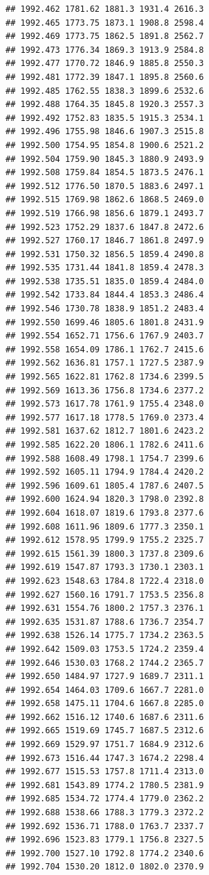 \documentclass[
]{book}
\begin{document}
\begin{verbatim}
## 1992.462 1781.62 1881.3 1931.4 2616.3
## 1992.465 1773.75 1873.1 1908.8 2598.4
## 1992.469 1773.75 1862.5 1891.8 2562.7
## 1992.473 1776.34 1869.3 1913.9 2584.8
## 1992.477 1770.72 1846.9 1885.8 2550.3
## 1992.481 1772.39 1847.1 1895.8 2560.6
## 1992.485 1762.55 1838.3 1899.6 2532.6
## 1992.488 1764.35 1845.8 1920.3 2557.3
## 1992.492 1752.83 1835.5 1915.3 2534.1
## 1992.496 1755.98 1846.6 1907.3 2515.8
## 1992.500 1754.95 1854.8 1900.6 2521.2
## 1992.504 1759.90 1845.3 1880.9 2493.9
## 1992.508 1759.84 1854.5 1873.5 2476.1
## 1992.512 1776.50 1870.5 1883.6 2497.1
## 1992.515 1769.98 1862.6 1868.5 2469.0
## 1992.519 1766.98 1856.6 1879.1 2493.7
## 1992.523 1752.29 1837.6 1847.8 2472.6
## 1992.527 1760.17 1846.7 1861.8 2497.9
## 1992.531 1750.32 1856.5 1859.4 2490.8
## 1992.535 1731.44 1841.8 1859.4 2478.3
## 1992.538 1735.51 1835.0 1859.4 2484.0
## 1992.542 1733.84 1844.4 1853.3 2486.4
## 1992.546 1730.78 1838.9 1851.2 2483.4
## 1992.550 1699.46 1805.6 1801.8 2431.9
## 1992.554 1652.71 1756.6 1767.9 2403.7
## 1992.558 1654.09 1786.1 1762.7 2415.6
## 1992.562 1636.81 1757.1 1727.5 2387.9
## 1992.565 1622.81 1762.8 1734.6 2399.5
## 1992.569 1613.36 1756.8 1734.6 2377.2
## 1992.573 1617.78 1761.9 1755.4 2348.0
## 1992.577 1617.18 1778.5 1769.0 2373.4
## 1992.581 1637.62 1812.7 1801.6 2423.2
## 1992.585 1622.20 1806.1 1782.6 2411.6
## 1992.588 1608.49 1798.1 1754.7 2399.6
## 1992.592 1605.11 1794.9 1784.4 2420.2
## 1992.596 1609.61 1805.4 1787.6 2407.5
## 1992.600 1624.94 1820.3 1798.0 2392.8
## 1992.604 1618.07 1819.6 1793.8 2377.6
## 1992.608 1611.96 1809.6 1777.3 2350.1
## 1992.612 1578.95 1799.9 1755.2 2325.7
## 1992.615 1561.39 1800.3 1737.8 2309.6
## 1992.619 1547.87 1793.3 1730.1 2303.1
## 1992.623 1548.63 1784.8 1722.4 2318.0
## 1992.627 1560.16 1791.7 1753.5 2356.8
## 1992.631 1554.76 1800.2 1757.3 2376.1
## 1992.635 1531.87 1788.6 1736.7 2354.7
## 1992.638 1526.14 1775.7 1734.2 2363.5
## 1992.642 1509.03 1753.5 1724.2 2359.4
## 1992.646 1530.03 1768.2 1744.2 2365.7
## 1992.650 1484.97 1727.9 1689.7 2311.1
## 1992.654 1464.03 1709.6 1667.7 2281.0
## 1992.658 1475.11 1704.6 1667.8 2285.0
## 1992.662 1516.12 1740.6 1687.6 2311.6
## 1992.665 1519.69 1745.7 1687.5 2312.6
## 1992.669 1529.97 1751.7 1684.9 2312.6
## 1992.673 1516.44 1747.3 1674.2 2298.4
## 1992.677 1515.53 1757.8 1711.4 2313.0
## 1992.681 1543.89 1774.2 1780.5 2381.9
## 1992.685 1534.72 1774.4 1779.0 2362.2
## 1992.688 1538.66 1788.3 1779.3 2372.2
## 1992.692 1536.71 1788.0 1763.7 2337.7
## 1992.696 1523.83 1779.1 1756.8 2327.5
## 1992.700 1527.10 1792.8 1774.2 2340.6
## 1992.704 1530.20 1812.0 1802.0 2370.9

\end{verbatim}
\end{document}
